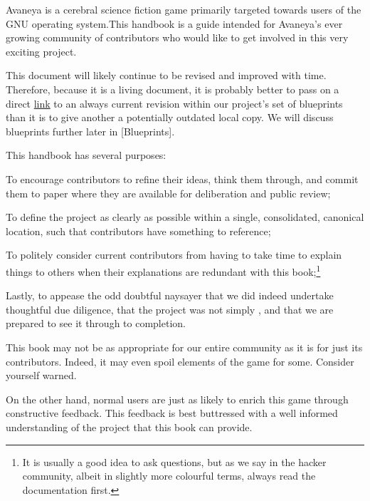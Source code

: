 

Avaneya is a cerebral science fiction game primarily targeted towards users of the GNU operating system. This handbook is a guide intended for Avaneya's ever growing community of contributors who would like to get involved in this very exciting project.

This document will likely continue to be revised and improved with time. Therefore, because it is a living document, it is probably better to pass on a direct \href{\LatestHandbookURL}{link} to an always current revision within our project's set of blueprints than it is to give another a potentially outdated local copy. We will discuss blueprints further later in [Blueprints].

This handbook has several purposes:

\startitemize[4]
\item
To encourage contributors to refine their ideas, think them through, and commit them to paper where they are available for deliberation and public review;

\item
To define the project as clearly as possible within a single, consolidated, canonical location, such that contributors have something to reference;

\item
To politely consider current contributors from having to take time to explain things to others when their explanations are redundant with this book;\footnote[rtfm]{It is usually a good idea to ask questions, but as we say in the hacker community, albeit in slightly more colourful terms, always read the documentation first.}

\item
Lastly, to appease the odd doubtful naysayer that we did indeed undertake thoughtful due diligence, that the project was not simply , and that we are prepared to see it through to completion.
\stopitemize

This book may not be as appropriate for our entire community as it is for just its contributors. Indeed, it may even spoil elements of the game for some. Consider yourself warned. 

On the other hand, normal users are just as likely to enrich this game through constructive feedback. This feedback is best buttressed with a well informed understanding of the project that this book can provide.

\StopChapter
